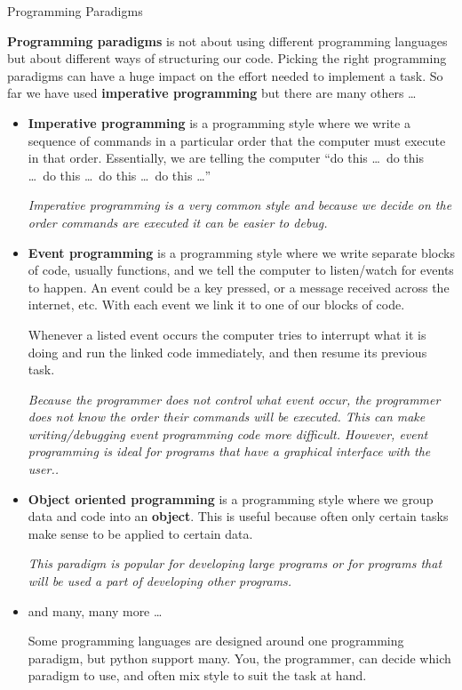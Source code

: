 \documentclass{coderdojo}
\begin{document}
\begin{asideBox}[colbacktitle=section!50,drop shadow, watermark tikz={\draw[line width=2mm] circle (1cm)
            node{\fontfamily{ptm}\fontseries{b}\fontsize{20mm}{20mm}\selectfont i};}]{Programming Paradigms}

{\bfseries Programming paradigms} is not about using different programming languages but about different ways of structuring our code.  Picking the right programming paradigms can have a huge impact on the effort needed to implement a task.  So far we have used {\bfseries imperative programming} but there are many others \ldots

\begin{itemize}
\item[\color{section}\larger\ding{237}]
{\bfseries Imperative programming} is a programming style where we write a sequence of commands in a particular order that the computer must execute in that order.  Essentially, we are telling the computer ``do this \ldots\ do this \ldots\ do this \ldots\ do this \ldots\ do this \ldots''

	{\smaller\it  Imperative programming is a very common style and because we decide on the order commands are executed it can be easier to debug.}
	
\item[\color{section}\larger\ding{237}] 
{\bfseries Event programming} is a programming style where we write separate blocks of code, usually functions, and we tell the computer to listen/watch for events to happen. An event could be a key pressed, or a message received across the internet, etc.  With each event we link it to one of our blocks of code. 

 Whenever a listed event occurs the computer tries to interrupt what it is doing and run the linked code immediately, and then resume its previous task. 

	{\smaller\it  Because the programmer does not control what event occur, the programmer does not know the order their commands will be executed.  This can make writing/debugging event programming code more difficult. However, event  programming is ideal for programs that have a graphical interface with the user..}
	
\item[\color{section}\larger\ding{237}]  
{\bfseries Object oriented programming} is a programming style where we group data and code into an {\bfseries object}. This is useful because often only certain tasks make sense to be applied to certain data. 

	{\smaller\it  This paradigm is popular for developing large programs or for programs that will be used a part of developing other programs.}
	
\item[\color{section}\larger\ding{237}]  and many, many more \ldots

Some programming languages are designed around one programming paradigm, but python support many. You, the programmer, can decide which paradigm to use, and often mix style to suit the task at hand.
\end{itemize}

\end{asideBox}
\end{document}
